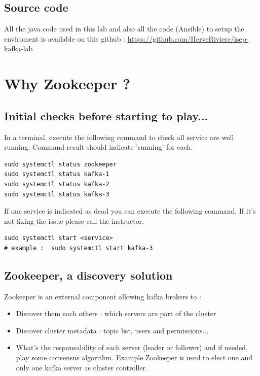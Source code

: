 \documentclass{article}
\newenvironment{code}
    { \begin{mdframed} }    {  \end{mdframed}}
\begin{document}
\subsection{Source code}
All the java code used in this lab and also all the code (Ansible) to setup the enviroment is available on this github : \href{https://github.com/HerveRiviere/isep-kafka-lab}{https://github.com/HerveRiviere/isep-kafka-lab}

\section{Why Zookeeper ?}
\subsection{Initial checks before starting to play...}
In a terminal, execute the following command to check all service are well running. Command result should indicate 'running' for each. 

\begin{code}
    \begin{verbatim}
sudo systemctl status zookeeper
sudo systemctl status kafka-1
sudo systemctl status kafka-2
sudo systemctl status kafka-3\end{verbatim}
\end{code}

If one service is indicated as dead you can execute the following command. If it's not fixing the issue please call the instructor.

\begin{code}
    \begin{verbatim}
sudo systemctl start <service>
# example :  sudo systemctl start kafka-3
    \end{verbatim}
\end{code}

\subsection{Zookeeper, a discovery solution}
Zookeeper is an external component allowing kafka brokers to : 
\begin{itemize}
\item Discover them each others : which servers are part of the cluster 
\item Discover cluster metadata : topic list, users and permissions...
\item What's the responsability of each server (leader or follower) and if needed, play some consensus algorithm. Example Zookeeper is used to elect one and only one kafka server as cluster controller.
\end{itemize}
\end{document}
